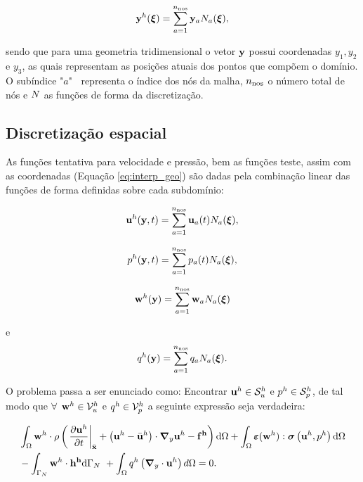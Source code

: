 \begin{align}
	\mathbf{y}^{h}(\bm{\xi}) = \sum_{a = 1}^{n_{\mathrm{nos}}} \mathbf{y}_{a}N_{a}(\boldsymbol{\xi}),  \label{eq:interp_geo}
\end{align}

\noindent sendo que para uma geometria tridimensional o vetor $\mathbf{y}$ possui coordenadas $y_1,y_2$ e $y_3$, as quais representam as posições atuais dos pontos que compõem o domínio. O subíndice "$a$" $ \ $ representa o índice dos nós da malha, $n_{\mathrm{nos}}$ o número total de nós e $N$ as funções de forma da discretização.


\subsection{Discretização espacial} \label{capitulo:Cap2:DiscEspacial}

As funções tentativa para velocidade e pressão, bem as funções teste, assim com as coordenadas (Equação \eqref{eq:interp_geo}) são dadas pela combinação linear das funções de forma definidas sobre cada subdomínio:

\begin{align}
	\mathbf{u}^h(\mathbf{y},t) = \sum_{a = 1}^{n_{\mathrm{nos}}} \mathbf{u}_{a}(t)N_{a}(\boldsymbol{\xi}), \label{eq:interp_vel}
\end{align}

\begin{align}
	p^h(\mathbf{y},t)  = \sum_{a = 1}^{n_{\mathrm{nos}}} p_{a}(t)N_{a}(\boldsymbol{\xi}),\label{eq:interp_press} 
\end{align}

\begin{align}
	\mathbf{w}^h(\mathbf{y})  = \sum_{a = 1}^{n_{\mathrm{nos}}} \mathbf{w}_{a}N_{a}(\boldsymbol{\xi}) \label{eq:interp_utest}
\end{align}

\noindent e
\begin{align}
	q^h(\mathbf{y})  = \sum_{a = 1}^{n_{\mathrm{nos}}} q_{a}N_{a}(\boldsymbol{\xi}). \label{eq:inter_ptest} 
\end{align}

O problema passa a ser enunciado como: Encontrar $\mathbf{u}^h \in \mathcal{S}_u^h$ e $p^h \in \mathcal{S}_p^h$, de tal modo que $\forall$ $\mathbf{w}^h \in \mathcal{V}_u^h$ e $q^h \in \mathcal{V}_p^h$ a seguinte expressão seja verdadeira:

\begin{align}
	\begin{split}
		&\int_{\Omega} \mathbf{w}^h \cdot \rho \left(\left. \frac{\partial\mathbf{u}^h}{\partial t} \right|_{\bar{\mathbf{x}}} + \left(\mathbf{u}^h - \bar{\mathbf{u}}^h \right)\cdot\boldsymbol{\nabla}_y \mathbf{u}^h - \mathbf{f^h} \right) \mathrm{d} \Omega + \int_{\Omega} \bm{\varepsilon}(\mathbf{w}^h) : \boldsymbol{\sigma}\left(\mathbf{u}^h,p^h \right)  \mathrm{d} \Omega\\ & - \int_{\Gamma_{N}} \mathbf{w}^h \cdot \mathbf{h^h} \mathrm{d} \Gamma_{N} \ + \int_{\Omega} q^h \left(\boldsymbol{\nabla}_y \cdot \mathbf{u}^h\right) d \Omega = 0.  \label{eq:QM_C_forma_fraca_1} 
	\end{split}
\end{align}


